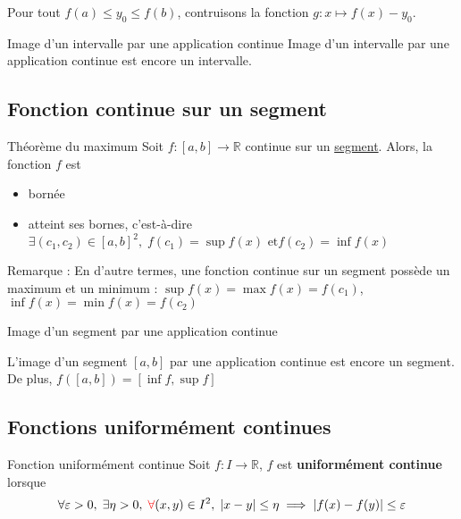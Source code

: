 \begin{myproof}{}{}
Pour tout $f(a) \le y_0 \le f(b)$, contruisons la fonction $g : x \mapsto f(x) - y_0$.
\end{myproof}



\begin{Corollary}{Image d'un intervalle par une application continue}{}
Image d'un intervalle par une application continue est encore un intervalle.
\end{Corollary}


\subsection{Fonction continue sur un segment} %
\label{sub:Fonction continue sur un segment}
\begin{Theorem}{Théorème du maximum}{}
  Soit $f:[a,b] \to \mathbb{R}$ continue sur un \underline{segment}. Alors, la fonction $f$ est 
  \begin{itemize}

      \item bornée 
      \item atteint ses bornes, c'est-à-dire $\exists (c_1, c_2) \in [a,b] ^{2}, \; f(c_1) = \sup f(x) \text{ et} f(c_2) = \inf f(x)$

  \end{itemize}
\end{Theorem}

Remarque : En d'autre termes, une fonction continue sur un segment possède un maximum et un minimum : $\sup f(x) = \max f(x) = f(c_1)$, $\inf f(x) = \min f(x) = f(c_2)$

\begin{Corollary}{Image d'un segment par une application continue}{}

  L'image d'un segment $[a,b]$ par une application continue est encore un segment. De plus, $f([a,b]) = [ \inf f, \sup f]$

\end{Corollary}

\subsection{Fonctions uniformément continues} %
\label{sub:Fonctions uniformément continues}
\begin{Definition}[colbacktitle=red!75!black]{Fonction uniformément continue}{}
Soit $f:I \to \mathbb{R}$, $f$ est \textbf{uniformément continue} lorsque 
\begin{equation}
  \forall \varepsilon>0, \; \exists \eta >0,\; {\color{red} \forall} (x, y) \in I ^{2}, \;| x- y| \le \eta  \implies |f(x) - f(y)| \le \varepsilon
\end{equation}
\end{Definition}

